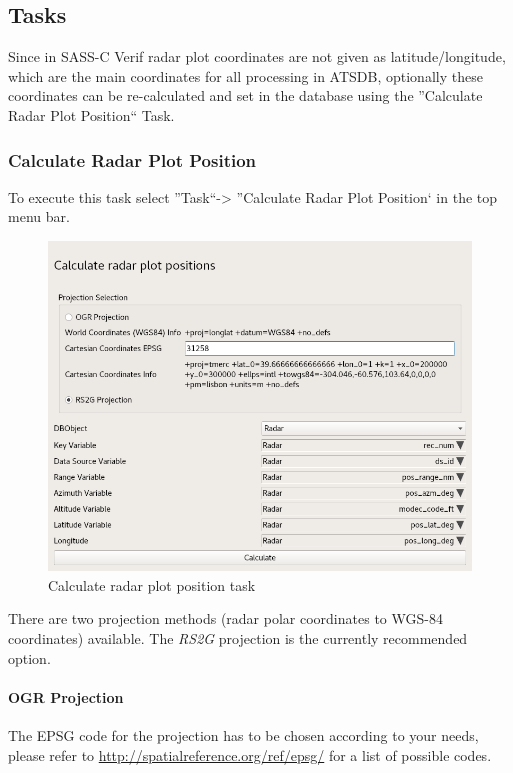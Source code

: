 \subsection{Tasks}
\label{sec:tasks}

Since in SASS-C Verif radar plot coordinates are not given as latitude/longitude, which are the main coordinates for all processing in ATSDB, optionally these coordinates can be re-calculated and set in the database using the ''Calculate Radar Plot Position`` Task.

\subsubsection{Calculate Radar Plot Position}
To execute this task select ''Task``->  ''Calculate Radar Plot Position` in the top menu bar.

\begin{figure}[H]
  \center
    \includegraphics[width=14cm,frame]{../screenshots/task_calc_radar.png}
  \caption{Calculate radar plot position task}
  \label{fig:task_calc_radar}
\end{figure}

There are two projection methods (radar polar coordinates to WGS-84 coordinates) available. The \textit{RS2G} projection is the currently recommended option.

\paragraph{OGR Projection}

The EPSG code for the projection has to be chosen according to your needs, please refer to \url{http://spatialreference.org/ref/epsg/} for a list of possible codes.


